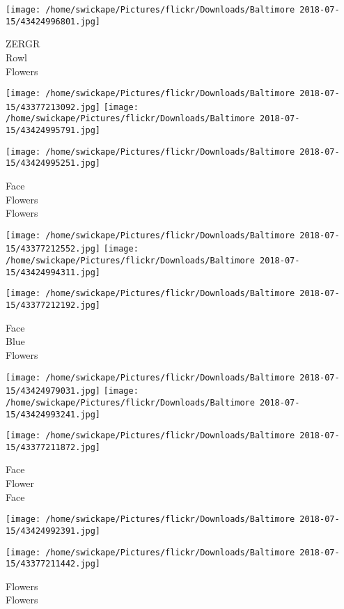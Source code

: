\documentclass[10pt,letterpaper]{article}
\begin{document}
\vspace{0.25in}
\texttt{[image: /home/swickape/Pictures/flickr/Downloads/Baltimore 2018-07-15/43424996801.jpg]}

ZERGR\\
Rowl\\
Flowers
\pagebreak

\texttt{[image: /home/swickape/Pictures/flickr/Downloads/Baltimore 2018-07-15/43377213092.jpg]}
\texttt{[image: /home/swickape/Pictures/flickr/Downloads/Baltimore 2018-07-15/43424995791.jpg]}

\vspace{0.25in}
\texttt{[image: /home/swickape/Pictures/flickr/Downloads/Baltimore 2018-07-15/43424995251.jpg]}

Face\\
Flowers\\
Flowers
\pagebreak

\texttt{[image: /home/swickape/Pictures/flickr/Downloads/Baltimore 2018-07-15/43377212552.jpg]}
\texttt{[image: /home/swickape/Pictures/flickr/Downloads/Baltimore 2018-07-15/43424994311.jpg]}

\vspace{0.25in}
\texttt{[image: /home/swickape/Pictures/flickr/Downloads/Baltimore 2018-07-15/43377212192.jpg]}

Face\\
Blue\\
Flowers
\pagebreak

\texttt{[image: /home/swickape/Pictures/flickr/Downloads/Baltimore 2018-07-15/43424979031.jpg]}
\texttt{[image: /home/swickape/Pictures/flickr/Downloads/Baltimore 2018-07-15/43424993241.jpg]}

\texttt{[image: /home/swickape/Pictures/flickr/Downloads/Baltimore 2018-07-15/43377211872.jpg]}

Face\\
Flower\\
Face
\pagebreak

\texttt{[image: /home/swickape/Pictures/flickr/Downloads/Baltimore 2018-07-15/43424992391.jpg]}

\vspace{0.25in}
\texttt{[image: /home/swickape/Pictures/flickr/Downloads/Baltimore 2018-07-15/43377211442.jpg]}

Flowers\\
Flowers
\pagebreak
\end{document}
